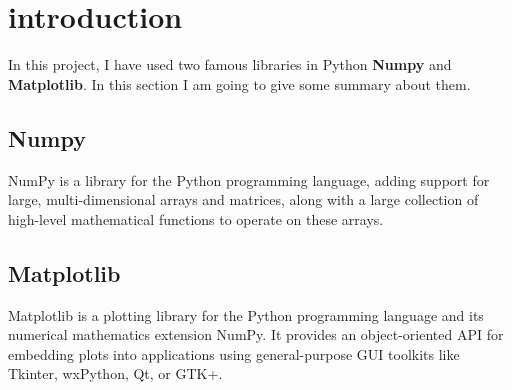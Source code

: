 \section{introduction}

In this project, I have used two 
famous libraries in Python \textbf{Numpy} and 
\textbf{Matplotlib}. In this section I am going to give some 
summary about them.
\subsection{Numpy}
NumPy is a library for the Python programming 
language, adding support for large, multi-dimensional 
arrays and matrices, along with a large collection 
of high-level mathematical functions to operate on 
these arrays.
\subsection{Matplotlib}
Matplotlib is a plotting library for the Python 
programming language and its numerical mathematics 
extension NumPy. It provides an object-oriented 
API for embedding plots into applications using 
general-purpose GUI toolkits like Tkinter, 
wxPython, Qt, or GTK+.